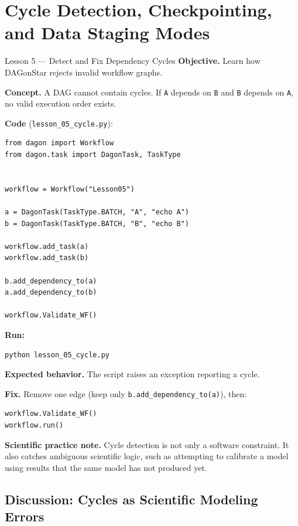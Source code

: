 \chapter{Cycle Detection, Checkpointing, and Data Staging Modes}
\label{ch:lessons-05-07}

\begin{lessonbox}{Lesson 5 --- Detect and Fix Dependency Cycles}
\textbf{Objective.} Learn how DAGonStar rejects invalid workflow graphs.

\textbf{Concept.} A DAG cannot contain cycles. If \texttt{A} depends on
\texttt{B} and \texttt{B} depends on \texttt{A}, no valid execution order
exists.

\textbf{Code} (\texttt{lesson\_05\_cycle.py}):
\begin{lstlisting}
from dagon import Workflow
from dagon.task import DagonTask, TaskType


workflow = Workflow("Lesson05")

a = DagonTask(TaskType.BATCH, "A", "echo A")
b = DagonTask(TaskType.BATCH, "B", "echo B")

workflow.add_task(a)
workflow.add_task(b)

b.add_dependency_to(a)
a.add_dependency_to(b)

workflow.Validate_WF()
\end{lstlisting}

\textbf{Run:}
\begin{lstlisting}[style=bash]
python lesson_05_cycle.py
\end{lstlisting}

\textbf{Expected behavior.} The script raises an exception reporting a
cycle.

\textbf{Fix.} Remove one edge (keep only \texttt{b.add\_dependency\_to(a)}),
then:
\begin{lstlisting}
workflow.Validate_WF()
workflow.run()
\end{lstlisting}

\textbf{Scientific practice note.} Cycle detection is not only a software
constraint. It also catches ambiguous scientific logic, such as attempting
to calibrate a model using results that the same model has not produced yet.
\end{lessonbox}

\section{Discussion: Cycles as Scientific Modeling Errors}

